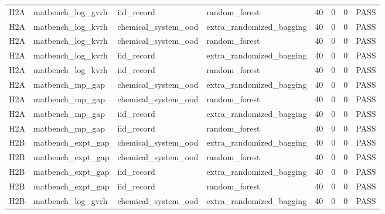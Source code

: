 \documentclass[10pt]{article}
\begin{document}
\begin{landscape}
\begin{longtable}{L{.32in}L{1.05in}L{1.2in}L{1.3in}L{.42in}L{.42in}L{.42in}L{.48in}}
H2A & matbench\_\allowbreak{}log\_\allowbreak{}gvrh & iid\_\allowbreak{}record & random\_\allowbreak{}forest & 40 & 0 & 0 & PASS\\
H2A & matbench\_\allowbreak{}log\_\allowbreak{}kvrh & chemical\_\allowbreak{}system\_\allowbreak{}ood & extra\_\allowbreak{}randomized\_\allowbreak{}bagging & 40 & 0 & 0 & PASS\\
H2A & matbench\_\allowbreak{}log\_\allowbreak{}kvrh & chemical\_\allowbreak{}system\_\allowbreak{}ood & random\_\allowbreak{}forest & 40 & 0 & 0 & PASS\\
H2A & matbench\_\allowbreak{}log\_\allowbreak{}kvrh & iid\_\allowbreak{}record & extra\_\allowbreak{}randomized\_\allowbreak{}bagging & 40 & 0 & 0 & PASS\\
H2A & matbench\_\allowbreak{}log\_\allowbreak{}kvrh & iid\_\allowbreak{}record & random\_\allowbreak{}forest & 40 & 0 & 0 & PASS\\
H2A & matbench\_\allowbreak{}mp\_\allowbreak{}gap & chemical\_\allowbreak{}system\_\allowbreak{}ood & extra\_\allowbreak{}randomized\_\allowbreak{}bagging & 40 & 0 & 0 & PASS\\
H2A & matbench\_\allowbreak{}mp\_\allowbreak{}gap & chemical\_\allowbreak{}system\_\allowbreak{}ood & random\_\allowbreak{}forest & 40 & 0 & 0 & PASS\\
H2A & matbench\_\allowbreak{}mp\_\allowbreak{}gap & iid\_\allowbreak{}record & extra\_\allowbreak{}randomized\_\allowbreak{}bagging & 40 & 0 & 0 & PASS\\
H2A & matbench\_\allowbreak{}mp\_\allowbreak{}gap & iid\_\allowbreak{}record & random\_\allowbreak{}forest & 40 & 0 & 0 & PASS\\
H2B & matbench\_\allowbreak{}expt\_\allowbreak{}gap & chemical\_\allowbreak{}system\_\allowbreak{}ood & extra\_\allowbreak{}randomized\_\allowbreak{}bagging & 40 & 0 & 0 & PASS\\
H2B & matbench\_\allowbreak{}expt\_\allowbreak{}gap & chemical\_\allowbreak{}system\_\allowbreak{}ood & random\_\allowbreak{}forest & 40 & 0 & 0 & PASS\\
H2B & matbench\_\allowbreak{}expt\_\allowbreak{}gap & iid\_\allowbreak{}record & extra\_\allowbreak{}randomized\_\allowbreak{}bagging & 40 & 0 & 0 & PASS\\
H2B & matbench\_\allowbreak{}expt\_\allowbreak{}gap & iid\_\allowbreak{}record & random\_\allowbreak{}forest & 40 & 0 & 0 & PASS\\
H2B & matbench\_\allowbreak{}log\_\allowbreak{}gvrh & chemical\_\allowbreak{}system\_\allowbreak{}ood & extra\_\allowbreak{}randomized\_\allowbreak{}bagging & 40 & 0 & 0 & PASS\\

\end{longtable}
\end{landscape}
\end{document}
